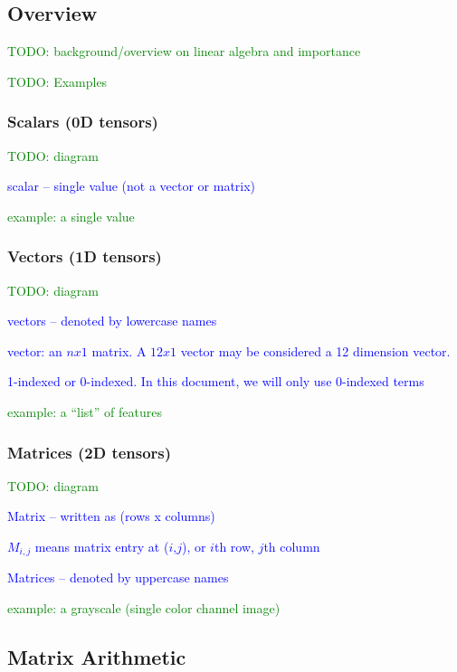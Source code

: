 \subsection{Overview}

\textcolor{green}{TODO: background/overview on linear algebra and importance}

\textcolor{green}{TODO: Examples}

\subsubsection{Scalars (0D tensors)}

\textcolor{green}{TODO: diagram}

\textcolor{blue}{scalar -- single value (not a vector or matrix)}

\textcolor{green}{example: a single value}



\subsubsection{Vectors (1D tensors)}

\textcolor{green}{TODO: diagram}

\textcolor{blue}{vectors -- denoted by lowercase names}

\textcolor{blue}{vector: an $n x 1$ matrix. A $12 x 1$ vector may be considered a 12 dimension vector.}

\textcolor{blue}{1-indexed or 0-indexed. In this document, we will only use 0-indexed terms}

\textcolor{green}{example: a ``list'' of features}


\subsubsection{Matrices (2D tensors)}

\textcolor{green}{TODO: diagram}

\textcolor{blue}{Matrix -- written as (rows x columns)}

\textcolor{blue}{$M_{i,j}$ means matrix entry at ($i$,$j$), or $i$th row, $j$th column}


\textcolor{blue}{Matrices -- denoted by uppercase names}

\textcolor{green}{example: a grayscale (single color channel image)}



\subsection{Matrix Arithmetic}

